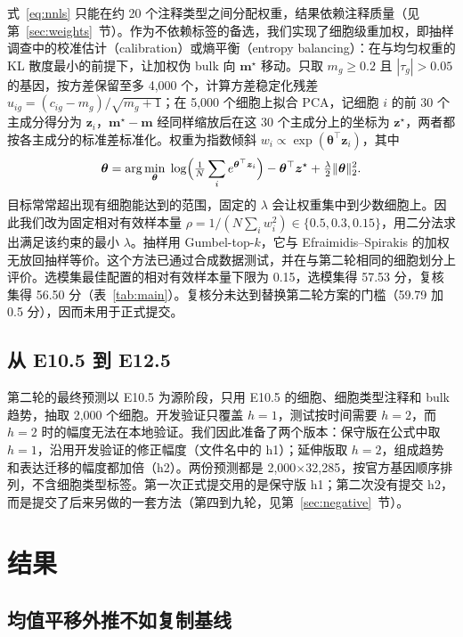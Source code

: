 \documentclass[UTF8,zihao=-4,fontset=none,a4paper]{ctexart}
\begin{document}
式~\eqref{eq:nnls} 只能在约 20 个注释类型之间分配权重，结果依赖注释质量（见第~\ref{sec:weights}~节）。作为不依赖标签的备选，我们实现了细胞级重加权，即抽样调查中的校准估计（calibration）或熵平衡（entropy balancing）\cite{deville,hainmueller}：在与均匀权重的 KL 散度最小的前提下，让加权伪 bulk 向 $\bm m^\star$ 移动。只取 $m_g\ge 0.2$ 且 $|\tau_g|>0.05$ 的基因，按方差保留至多 4,000 个，计算方差稳定化残差 $u_{ig}=(c_{ig}-m_g)/\sqrt{m_g+1}$；在 5,000 个细胞上拟合 PCA，记细胞 $i$ 的前 30 个主成分得分为 $\bm z_i$，$\bm m^\star-\bm m$ 经同样缩放后在这 30 个主成分上的坐标为 $\bm z^\star$，两者都按各主成分的标准差标准化。权重为指数倾斜 $w_i\propto\exp(\bm\theta^\top\bm z_i)$，其中
\begin{equation}
\bm\theta=\arg\min_{\bm\theta}\;\log\Bigl(\tfrac1N\sum_i e^{\bm\theta^\top\bm z_i}\Bigr)-\bm\theta^\top\bm z^\star+\tfrac{\lambda}{2}\|\bm\theta\|_2^2 .
\end{equation}
目标常常超出现有细胞能达到的范围，固定的 $\lambda$ 会让权重集中到少数细胞上。因此我们改为固定相对有效样本量 $\rho=1/(N\sum_i w_i^2)\in\{0.5,0.3,0.15\}$，用二分法求出满足该约束的最小 $\lambda$。抽样用 Gumbel-top-$k$，它与 Efraimidis--Spirakis 的加权无放回抽样等价\cite{efraimidis}。这个方法已通过合成数据测试，并在与第二轮相同的细胞划分上评价。选模集最佳配置的相对有效样本量下限为 0.15，选模集得 57.53 分，复核集得 56.50 分（表~\ref{tab:main}）。复核分未达到替换第二轮方案的门槛（59.79 加 0.5 分），因而未用于正式提交。

\subsection{从 E10.5 到 E12.5}

第二轮的最终预测以 E10.5 为源阶段，只用 E10.5 的细胞、细胞类型注释和 bulk 趋势，抽取 2,000 个细胞。开发验证只覆盖 $h=1$，测试按时间需要 $h=2$，而 $h=2$ 时的幅度无法在本地验证。我们因此准备了两个版本：保守版在公式中取 $h=1$，沿用开发验证的修正幅度（文件名中的 h1）；延伸版取 $h=2$，组成趋势和表达迁移的幅度都加倍（h2）。两份预测都是 2,000$\times$32,285，按官方基因顺序排列，不含细胞类型标签。第一次正式提交用的是保守版 h1；第二次没有提交 h2，而是提交了后来另做的一套方法（第四到九轮，见第~\ref{sec:negative}~节）。

\section{结果}

\subsection{均值平移外推不如复制基线}\label{sec:linear}
\end{document}
